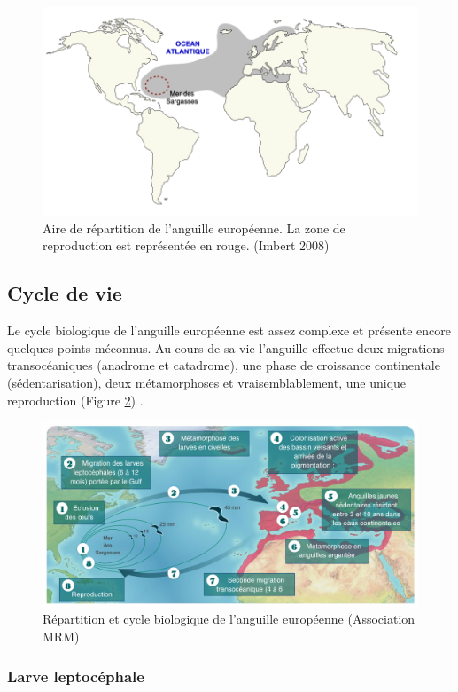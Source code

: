\documentclass[11pt,titlepage,twoside]{article}\usepackage[]{graphicx}\usepackage[table]{xcolor}
\begin{document}
\begin{figure}[htpb]
\centering
\includegraphics[width=\textwidth]{Aire}
\caption{Aire de répartition de l'anguille européenne. La zone de reproduction est représentée en rouge. (Imbert 2008)}
\label{Aire}
\end{figure}


\subsection{Cycle de vie}

Le cycle biologique de l’anguille européenne est assez complexe et présente encore quelques points méconnus. Au cours de sa vie l’anguille effectue deux migrations transocéaniques (anadrome et catadrome), une phase de croissance continentale (sédentarisation), deux métamorphoses et vraisemblablement, une unique reproduction (Figure \ref{Cycle}) \citep{anthony_bases_2006}. 

\begin{figure}[htpb]
\centering
\includegraphics[width=\textwidth]{Cycle}
\caption{Répartition et cycle biologique de l'anguille européenne (Association MRM)}
\label{Cycle}
\end{figure}

\subsubsection{Larve leptocéphale}




\normalsize
\null
\vfill
\end{document}
